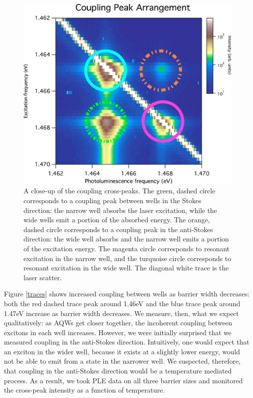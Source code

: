 \begin{figure}[!h]
\centering
\includegraphics[width = .65\textwidth]{Layouttryit.jpg}
\caption{ \doublespacing A close-up of the coupling cross-peaks. The green, dashed circle corresponds to a coupling peak between wells in the Stokes direction: the narrow well absorbs the laser excitation, while the wide wells emit a portion of the absorbed energy. The orange, dashed circle corresponds to a coupling peak in the anti-Stokes direction: the wide well absorbs and the narrow well emits a portion of the excitation energy. The magenta circle corresponds to resonant excitation in the narrow well, and the turquoise circle corresponds to resonant excitation in the wide well. The diagonal white trace is the laser scatter.}
\label{peakscheme}
\end{figure}
\newpage \indent Figure \ref{traces} shows increased coupling between wells as barrier width decreases: both the red dashed trace peak around 1.46eV and the blue trace peak around 1.47eV increase as barrier width decreases. We measure, then, what we expect qualitatively: as AQWs get closer together, the incoherent coupling between excitons in each well increases. However, we were initially surprised that we measured coupling in the anti-Stokes direction. Intuitively, one would expect that an exciton in the wider well, because it exists at a slightly lower energy, would not be able to emit from a state in the narrower well. We suspected, therefore, that coupling in the anti-Stokes direction would be a temperature mediated process. As a result, we took PLE data on all three barrier sizes and monitored the cross-peak intensity as a function of temperature. 

